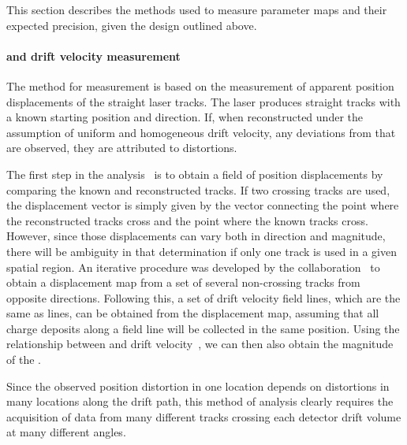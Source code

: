 This section describes the methods used to measure 
parameter maps and their expected precision, given the design outlined above.

\paragraph{\efield and drift velocity measurement}
The method for \efield measurement is based on the measurement of apparent position displacements of the straight laser tracks. The laser produces straight tracks with a known starting position and direction. If, when reconstructed under the assumption of uniform and homogeneous drift velocity, any deviations from that are observed, they are attributed to \efield distortions. 

The first step in the analysis~\cite{bib:uBlaser2019} is to obtain a field of position displacements by comparing the known and reconstructed tracks. If two crossing tracks are used, the displacement vector is simply given by the vector connecting the point where the reconstructed tracks cross and the point where the known tracks cross. However, since those displacements can vary both in direction and magnitude, there will be ambiguity in that determination if only one track is used in a given spatial region. An iterative procedure was developed by the  collaboration~\cite{bib:chen2018,bib:uBlaser2019} to obtain a displacement map from a set of several non-crossing tracks from opposite directions. Following this, a set of drift velocity field lines, which are the same as \efield lines, can be obtained from the displacement map, assuming that all charge deposits along a field line will be collected in the same position. Using the relationship between \efield and drift velocity~\cite{Li:2015rqa,Walkowiak:2000wf}, we can then also obtain the magnitude of the \efield.

Since the observed position distortion in one location depends on \efield distortions in many locations along the drift path, this method of analysis clearly requires the acquisition of data from many different tracks crossing each detector drift volume at many different angles. 

